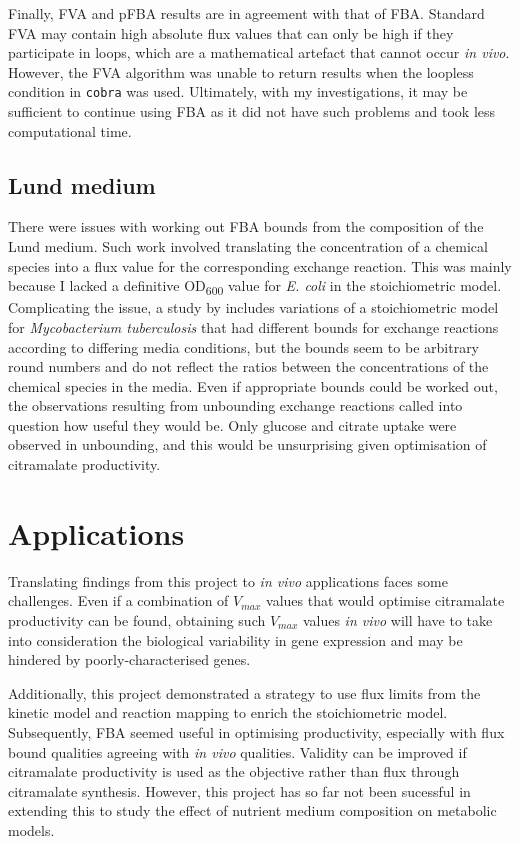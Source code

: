 \documentclass[parskip=full, numbers=noenddot]{scrreprt}
\begin{document}
Finally, FVA and pFBA results are in agreement with that of FBA. Standard FVA may contain high absolute flux values that can only be high if they participate in loops, which are a mathematical artefact that cannot occur \emph{in vivo}. However, the FVA algorithm was unable to return results when the loopless condition in \texttt{cobra} was used. Ultimately, with my investigations, it may be sufficient to continue using FBA as it did not have such problems and took less computational time.

\subsection{Lund medium}
\label{ssec:discussion-stoichiometric-lund}

There were issues with working out FBA bounds from the composition of the Lund medium. Such work involved translating the concentration of a chemical species into a flux value for the corresponding exchange reaction. This was mainly because I lacked a definitive OD\textsubscript{600} value for \emph{E. coli} in the stoichiometric model. Complicating the issue, a study by \citet{kavvas_updated_2018} includes variations of a stoichiometric model for \emph{Mycobacterium tuberculosis} that had different bounds for exchange reactions according to differing media conditions, but the bounds seem to be arbitrary round numbers and do not reflect the ratios between the concentrations of the chemical species in the media. Even if appropriate bounds could be worked out, the observations resulting from unbounding exchange reactions called into question how useful they would be. Only glucose and citrate uptake were observed in unbounding, and this would be unsurprising given optimisation of citramalate productivity.

\section{Applications}
\label{sec:discussion-applications}

Translating findings from this project to \emph{in vivo} applications faces some challenges. Even if a combination of $V_{max}$ values that would optimise citramalate productivity can be found, obtaining such $V_{max}$ values \emph{in vivo} will have to take into consideration the biological variability in gene expression and may be hindered by poorly-characterised genes.

Additionally, this project demonstrated a strategy to use flux limits from the kinetic model and reaction mapping to enrich the stoichiometric model. Subsequently, FBA seemed useful in optimising productivity, especially with flux bound qualities agreeing with \emph{in vivo} qualities. Validity can be improved if citramalate productivity is used as the objective rather than flux through citramalate synthesis. However, this project has so far not been sucessful in extending this to study the effect of nutrient medium composition on metabolic models.
\end{document}
